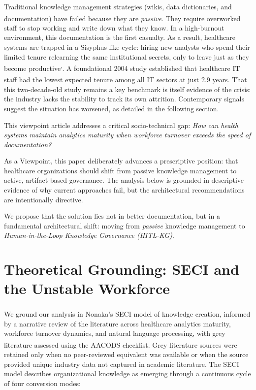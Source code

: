 \documentclass[
  american,
  11pt,
  letterpaper,
  oneside  ,captions=tableheading
]{scrartcl}
\begin{document}
Traditional knowledge management strategies (wikis, data dictionaries,
and documentation) have failed because they are
\emph{passive}\textsuperscript{}. They
require overworked staff to stop working and write down what they know.
In a high-burnout environment, this documentation is the first casualty.
As a result, healthcare systems are trapped in a Sisyphus-like cycle:
hiring new analysts who spend their limited tenure relearning the same
institutional secrets, only to leave just as they become
productive\textsuperscript{,}.
A foundational 2004 study established that healthcare IT staff had the
lowest expected tenure among all IT sectors at just 2.9
years\textsuperscript{}. That this
two-decade-old study remains a key benchmark is itself evidence of the
crisis: the industry lacks the stability to track its own attrition.
Contemporary signals suggest the situation has worsened, as detailed in
the following section.

This viewpoint article addresses a critical socio-technical gap:
\emph{How can health systems maintain analytics maturity when workforce
turnover exceeds the speed of documentation?}

As a Viewpoint, this paper deliberately advances a prescriptive
position: that healthcare organizations should shift from passive
knowledge management to active, artifact-based governance. The analysis
below is grounded in descriptive evidence of why current approaches
fail, but the architectural recommendations are intentionally directive.

We propose that the solution lies not in better documentation, but in a
fundamental architectural shift: moving from \emph{passive} knowledge
management to \emph{Human-in-the-Loop Knowledge Governance (HITL-KG)}.

\section{Theoretical Grounding: SECI and the Unstable
Workforce}\label{theoretical-grounding-seci-and-the-unstable-workforce}

We ground our analysis in Nonaka's SECI model of knowledge
creation\textsuperscript{}, informed by a
narrative review of the literature across healthcare analytics maturity,
workforce turnover dynamics, and natural language processing, with grey
literature assessed using the AACODS
checklist\textsuperscript{}. Grey
literature sources were retained only when no peer-reviewed equivalent
was available or when the source provided unique industry data not
captured in academic literature. The SECI model describes organizational
knowledge as emerging through a continuous cycle of four conversion
modes:
\end{document}
